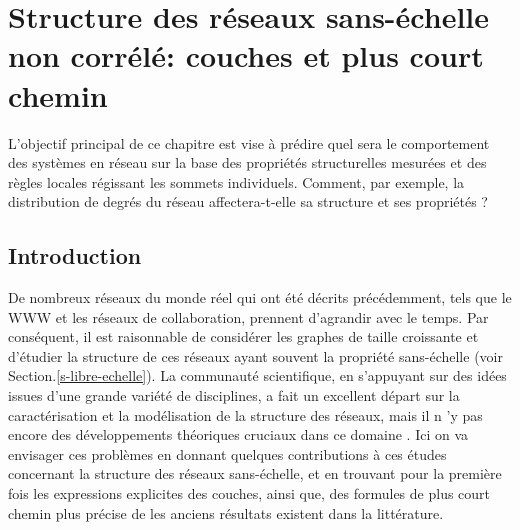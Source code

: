 \newcommand{\nl}{$n_{\ell}$ }
\newcommand{\km}{\textless k \textgreater}
\chapter{Structure des réseaux sans-échelle non corrélé: couches et plus court chemin}
\label{sec3}
L'objectif principal de ce chapitre est vise à prédire quel sera le comportement des systèmes en réseau sur la base des propriétés structurelles mesurées et des règles locales régissant les sommets individuels. Comment, par exemple, la distribution de degrés du réseau affectera-t-elle sa  structure et ses propriétés ?

\section{Introduction}

De nombreux réseaux du monde réel qui ont été décrits précédemment, tels que le WWW et les réseaux de collaboration, prennent d'agrandir avec le temps. Par conséquent, il est raisonnable de considérer les graphes de taille croissante et d'étudier la structure de ces réseaux ayant souvent la propriété sans-échelle (voir Section.\ref{s-libre-echelle}). 
La communauté scientifique, en s'appuyant sur des idées issues d'une grande variété de disciplines, a fait un excellent départ sur la caractérisation et la modélisation de la structure des réseaux, mais il n 'y pas encore des développements théoriques cruciaux dans ce domaine \cite{Ne2003}. Ici on va envisager ces problèmes en donnant quelques contributions à ces études concernant la structure des réseaux sans-échelle, et en trouvant pour la première fois les expressions explicites des couches, ainsi que, des formules de plus court chemin plus précise de les anciens résultats existent dans la littérature. 
